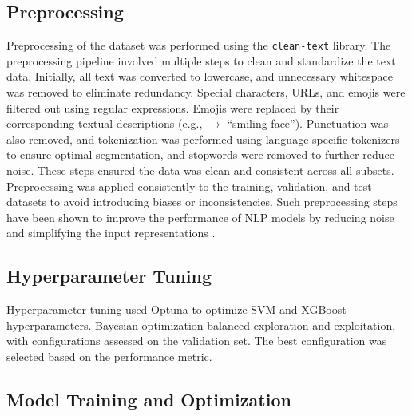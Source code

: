 \subsection{Preprocessing}

Preprocessing of the dataset was performed using the \texttt{clean-text} library. The preprocessing pipeline involved multiple steps to clean and standardize the text data. Initially, all text was converted to lowercase, and unnecessary whitespace was removed to eliminate redundancy. Special characters, URLs, and emojis were filtered out using regular expressions. Emojis were replaced by their corresponding textual descriptions (e.g., \smiley $\rightarrow$ ``smiling face''). Punctuation was also removed, and  tokenization was performed using language-specific tokenizers to ensure optimal segmentation, and stopwords were removed to further reduce noise. These steps ensured the data was clean and consistent across all subsets. Preprocessing was applied consistently to the training, validation, and test datasets to avoid introducing biases or inconsistencies. Such preprocessing steps have been shown to improve the performance of NLP models by reducing noise and simplifying the input representations \citep{Zhang2020DataPrep}.

\subsection{Hyperparameter Tuning}

Hyperparameter tuning used Optuna \citep{Akiba2019Optuna} to optimize SVM and XGBoost hyperparameters. Bayesian optimization balanced exploration and exploitation, with configurations assessed on the validation set. The best configuration was selected based on the performance metric.

\subsection{Model Training and Optimization}

